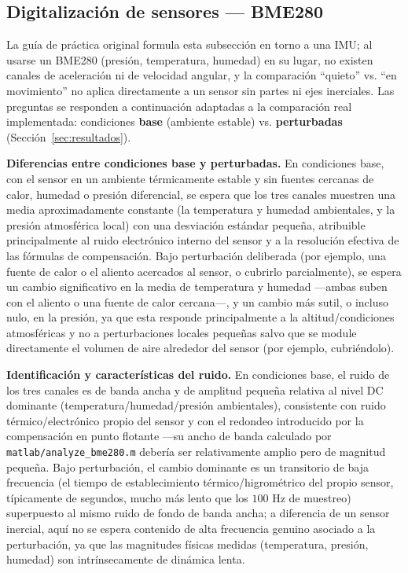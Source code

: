 \subsection{Digitalización de sensores — BME280}

La guía de práctica original formula esta subsección en torno a una IMU; al usarse un BME280 (presión, temperatura, humedad) en su lugar, no existen canales de aceleración ni de velocidad angular, y la comparación ``quieto'' vs. ``en movimiento'' no aplica directamente a un sensor sin partes ni ejes inerciales. Las preguntas se responden a continuación adaptadas a la comparación real implementada: condiciones \textbf{base} (ambiente estable) vs. \textbf{perturbadas} (Sección~\ref{sec:resultados}).

\textbf{Diferencias entre condiciones base y perturbadas.} En condiciones base, con el sensor en un ambiente térmicamente estable y sin fuentes cercanas de calor, humedad o presión diferencial, se espera que los tres canales muestren una media aproximadamente constante (la temperatura y humedad ambientales, y la presión atmosférica local) con una desviación estándar pequeña, atribuible principalmente al ruido electrónico interno del sensor y a la resolución efectiva de las fórmulas de compensación. Bajo perturbación deliberada (por ejemplo, una fuente de calor o el aliento acercados al sensor, o cubrirlo parcialmente), se espera un cambio significativo en la media de temperatura y humedad —ambas suben con el aliento o una fuente de calor cercana—, y un cambio más sutil, o incluso nulo, en la presión, ya que esta responde principalmente a la altitud/condiciones atmosféricas y no a perturbaciones locales pequeñas salvo que se module directamente el volumen de aire alrededor del sensor (por ejemplo, cubriéndolo).

\textbf{Identificación y características del ruido.} En condiciones base, el ruido de los tres canales es de banda ancha y de amplitud pequeña relativa al nivel DC dominante (temperatura/humedad/presión ambientales), consistente con ruido térmico/electrónico propio del sensor y con el redondeo introducido por la compensación en punto flotante —su ancho de banda calculado por \texttt{matlab/analyze\_bme280.m} debería ser relativamente amplio pero de magnitud pequeña. Bajo perturbación, el cambio dominante es un transitorio de baja frecuencia (el tiempo de establecimiento térmico/higrométrico del propio sensor, típicamente de segundos, mucho más lento que los $100$ Hz de muestreo) superpuesto al mismo ruido de fondo de banda ancha; a diferencia de un sensor inercial, aquí no se espera contenido de alta frecuencia genuino asociado a la perturbación, ya que las magnitudes físicas medidas (temperatura, presión, humedad) son intrínsecamente de dinámica lenta.

